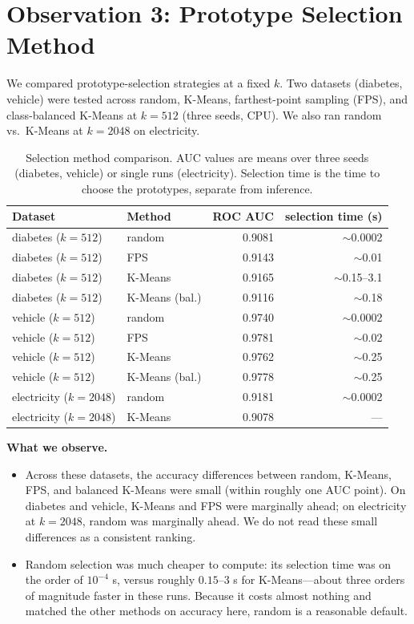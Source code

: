 \documentclass[11pt,a4paper]{article}
\begin{document}
\section{Observation 3: Prototype Selection Method}

We compared prototype-selection strategies at a fixed $k$. Two datasets
(diabetes, vehicle) were tested across random, K-Means, farthest-point sampling
(FPS), and class-balanced K-Means at $k{=}512$ (three seeds, CPU). We also ran
random vs.\ K-Means at $k{=}2048$ on electricity.

\begin{table}[h]
\centering
\caption{Selection method comparison. AUC values are means over three seeds
(diabetes, vehicle) or single runs (electricity). Selection time is the time to
choose the prototypes, separate from inference.}
\label{tab:selection}
\begin{tabular}{llrr}
\toprule
Dataset & Method & ROC AUC & selection time (s) \\
\midrule
diabetes ($k{=}512$) & random          & 0.9081 & $\sim$0.0002 \\
diabetes ($k{=}512$) & FPS             & 0.9143 & $\sim$0.01 \\
diabetes ($k{=}512$) & K-Means         & 0.9165 & $\sim$0.15--3.1 \\
diabetes ($k{=}512$) & K-Means (bal.)  & 0.9116 & $\sim$0.18 \\
\midrule
vehicle ($k{=}512$)  & random          & 0.9740 & $\sim$0.0002 \\
vehicle ($k{=}512$)  & FPS             & 0.9781 & $\sim$0.02 \\
vehicle ($k{=}512$)  & K-Means         & 0.9762 & $\sim$0.25 \\
vehicle ($k{=}512$)  & K-Means (bal.)  & 0.9778 & $\sim$0.25 \\
\midrule
electricity ($k{=}2048$) & random      & 0.9181 & $\sim$0.0002 \\
electricity ($k{=}2048$) & K-Means      & 0.9078 & --- \\
\bottomrule
\end{tabular}
\end{table}

\textbf{What we observe.}
\begin{itemize}
\item Across these datasets, the accuracy differences between random, K-Means,
FPS, and balanced K-Means were small (within roughly one AUC point). On diabetes
and vehicle, K-Means and FPS were marginally ahead; on electricity at
$k{=}2048$, random was marginally ahead. We do not read these small differences
as a consistent ranking.
\item Random selection was much cheaper to compute: its selection time was on
the order of $10^{-4}$ s, versus roughly $0.15$--$3$ s for K-Means---about three
orders of magnitude faster in these runs. Because it costs almost nothing and
matched the other methods on accuracy here, random is a reasonable default.
\end{itemize}
\end{document}
